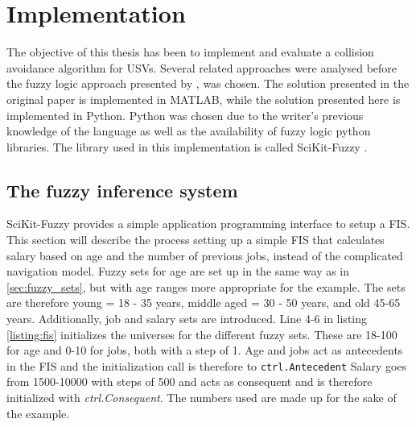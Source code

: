 

\chapter{Implementation}
\label{chap_impl}
The objective of this thesis has been to implement and evaluate a  collision avoidance  algorithm for USVs. Several related approaches were analysed before the fuzzy logic approach presented by \textcite{perera2012intelligent}, was chosen.
The solution presented in the original paper is implemented in MATLAB, while the solution presented here is implemented in Python. Python was chosen due to the writer's previous knowledge of the language as well as the availability of fuzzy logic python libraries. The library used in this implementation is called SciKit-Fuzzy \cite{josh_warner_2017_1002946}.

\section{The fuzzy inference system}
SciKit-Fuzzy provides a simple application programming interface to setup a FIS. This section will describe the process setting up a simple FIS that calculates salary based on age and the number of previous jobs, instead of the complicated navigation model. Fuzzy sets for age are set up in the same way as in \ref{sec:fuzzy_sets}, but with age ranges more appropriate for the example. The sets are therefore young = 18 - 35 years, middle aged = 30 - 50 years, and old 45-65 years.  Additionally, job and salary sets are introduced. Line 4-6 in listing \ref{listing:fis} initializes the universes for the different fuzzy sets. These are 18-100 for age and 0-10 for jobs, both with a step of 1. Age and jobs act as antecedents in the FIS and the initialization call is therefore to  \texttt{ctrl.Antecedent} Salary goes from 1500-10000 with steps of 500 and acts as consequent and is therefore initialized with  \textit{ctrl.Consequent}. The numbers used are made up for the sake of the example.

